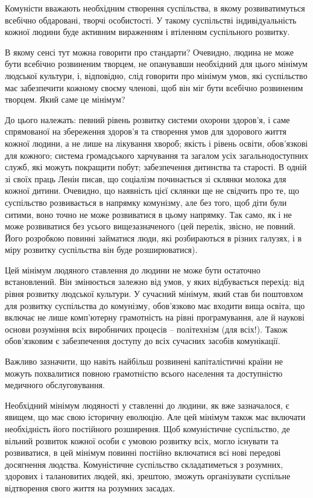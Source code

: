 \documentclass[12pt,a4paper,openany]{book}
\begin{document}
Комуністи вважають необхідним створення суспільства, в якому розвиватимуться всебічно обдаровані, творчі особистості. У такому суспільстві індивідуальність кожної людини буде активним вираженням і втіленням суспільного розвитку.

В якому сенсі тут можна говорити про стандарти? Очевидно, людина не може бути всебічно розвиненим творцем, не опанувавши необхідний для цього мінімум людської культури, і, відповідно, слід говорити про мінімум умов, які суспільство має забезпечити кожному своєму членові, щоб він міг бути всебічно розвиненим творцем. Який саме це мінімум?

До цього належать: певний рівень розвитку системи охорони здоров’я, і саме спрямованої на збереження здоров’я та створення умов для здорового життя кожної людини, а не лише на лікування хвороб; якість і рівень освіти, обов’язкові для кожного; система громадського харчування та загалом усіх загальнодоступних служб, які можуть покращити побут; забезпечення дитинства та старості. В одній зі своїх праць Ленін писав, що соціалізм починається зі склянки молока для кожної дитини. Очевидно, що наявність цієї склянки ще не свідчить про те, що суспільство розвивається в напрямку комунізму, але без того, щоб діти були ситими, воно точно не може розвиватися в цьому напрямку. Так само, як і не може розвиватися без усього вищезазначеного (цей перелік, звісно, не повний. Його розробкою повинні займатися люди, які розбираються в різних галузях, і в міру розвитку суспільства він буде розширюватися).

Цей мінімум людяного ставлення до людини не може бути остаточно встановлений. Він змінюється залежно від умов, у яких відбувається перехід: від рівня розвитку людської культури. У сучасний мінімум, який став би поштовхом для розвитку суспільства до комунізму, обов’язково має входити вища освіта, що включає не лише комп’ютерну грамотність на рівні програмування, але й наукові основи розуміння всіх виробничих процесів – політехнізм (для всіх!). Також обов’язковим є забезпечення доступу до всіх сучасних засобів комунікації.

Важливо зазначити, що навіть найбільш розвинені капіталістичні країни не можуть похвалитися повною грамотністю всього населення та доступністю медичного обслуговування.

Необхідний мінімум людяності у ставленні до людини, як вже зазначалося, є явищем, що має свою історичну еволюцію. Але цей мінімум також має включати необхідність його постійного розширення. Щоб комуністичне суспільство, де вільний розвиток кожної особи є умовою розвитку всіх, могло існувати та розвиватися, в цей мінімум повинні постійно включатися всі нові передові досягнення людства. Комуністичне суспільство складатиметься з розумних, здорових і талановитих людей, які, зрештою, зможуть організувати суспільне відтворення свого життя на розумних засадах.
\ifSubfilesClassLoaded{\setcounter{page}{50}}{}
\end{document}
